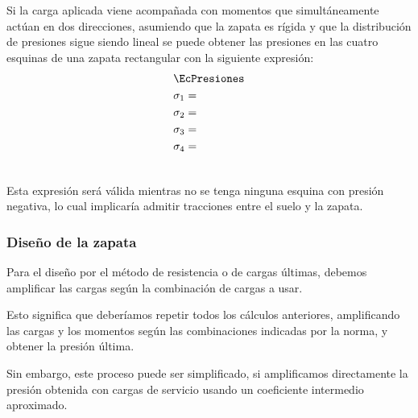 \documentclass{article}%
\begin{document}
Si la carga aplicada viene acompañada con momentos que simultáneamente actúan en dos direcciones, asumiendo que la zapata es rígida y que la distribución de presiones sigue siendo lineal se puede obtener las presiones en las cuatro esquinas de una zapata rectangular con la siguiente expresión:
\begin{align}
	&\EcPresiones \\ \nonumber
	&\sigma_1 =\\ \nonumber
	&\sigma_2 =\\ \nonumber
	&\sigma_3 =\\ \nonumber
	&\sigma_4 =\\ \nonumber
\end{align}

Esta expresión será válida mientras no se tenga ninguna esquina con presión negativa,
lo cual implicaría admitir tracciones entre el suelo y la zapata.


\subsubsection{Diseño de la zapata}

Para el diseño por el método de resistencia o de cargas últimas, debemos amplificar las cargas según la combinación de cargas a usar.

Esto significa que deberíamos repetir todos los cálculos anteriores, amplificando las cargas y los momentos según las combinaciones indicadas por la norma, y obtener la presión última.

Sin embargo, este proceso puede ser simplificado, si amplificamos directamente la presión obtenida con cargas de servicio usando un coeficiente intermedio aproximado.

\end{document}
